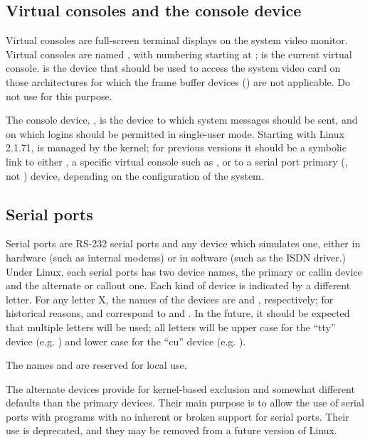 \documentclass[a4paper,8pt,english]{sphinxmanual}
\begin{document}
\subsection{Virtual consoles and the console device}
\label{admin-guide/devices:virtual-consoles-and-the-console-device}
Virtual consoles are full-screen terminal displays on the system video
monitor.  Virtual consoles are named , with numbering
starting at ;  is the current virtual console.
 is the device that should be used to access the system video
card on those architectures for which the frame buffer devices
() are not applicable. Do not use 
for this purpose.

The console device, , is the device to which system
messages should be sent, and on which logins should be permitted in
single-user mode.  Starting with Linux 2.1.71,  is managed
by the kernel; for previous versions it should be a symbolic link to
either , a specific virtual console such as , or to
a serial port primary (, not ) device, depending on the
configuration of the system.


\subsection{Serial ports}
\label{admin-guide/devices:serial-ports}
Serial ports are RS-232 serial ports and any device which simulates
one, either in hardware (such as internal modems) or in software (such
as the ISDN driver.)  Under Linux, each serial ports has two device
names, the primary or callin device and the alternate or callout one.
Each kind of device is indicated by a different letter.  For any
letter X, the names of the devices are  and ,
respectively; for historical reasons,  and 
correspond to  and . In the future, it should be
expected that multiple letters will be used; all letters will be upper
case for the ``tty'' device (e.g. ) and lower case for the
``cu'' device (e.g. ).

The names  and  are reserved for local use.

The alternate devices provide for kernel-based exclusion and somewhat
different defaults than the primary devices.  Their main purpose is to
allow the use of serial ports with programs with no inherent or broken
support for serial ports.  Their use is deprecated, and they may be
removed from a future version of Linux.
\end{document}
